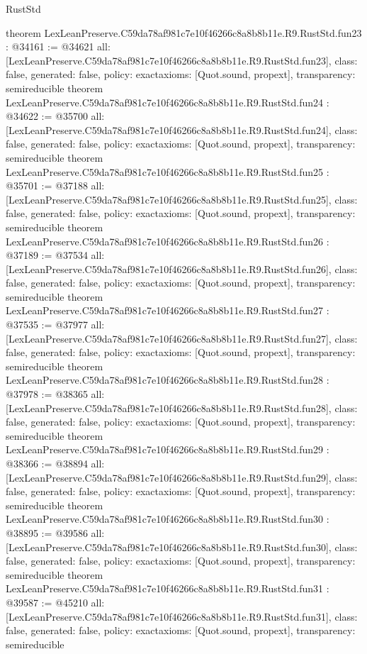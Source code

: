 \begin{lexlean}{RustStd}
\begin{coremodule}
{}
theorem LexLeanPreserve.C59da78af981c7e10f46266c8a8b8b11e.R9.RustStd.fun23 : @34161 := @34621 {
  all: [LexLeanPreserve.C59da78af981c7e10f46266c8a8b8b11e.R9.RustStd.fun23],
  class: false,
  generated: false,
  policy: exact{axioms: [Quot.sound, propext]},
  transparency: semireducible
}
theorem LexLeanPreserve.C59da78af981c7e10f46266c8a8b8b11e.R9.RustStd.fun24 : @34622 := @35700 {
  all: [LexLeanPreserve.C59da78af981c7e10f46266c8a8b8b11e.R9.RustStd.fun24],
  class: false,
  generated: false,
  policy: exact{axioms: [Quot.sound, propext]},
  transparency: semireducible
}
theorem LexLeanPreserve.C59da78af981c7e10f46266c8a8b8b11e.R9.RustStd.fun25 : @35701 := @37188 {
  all: [LexLeanPreserve.C59da78af981c7e10f46266c8a8b8b11e.R9.RustStd.fun25],
  class: false,
  generated: false,
  policy: exact{axioms: [Quot.sound, propext]},
  transparency: semireducible
}
theorem LexLeanPreserve.C59da78af981c7e10f46266c8a8b8b11e.R9.RustStd.fun26 : @37189 := @37534 {
  all: [LexLeanPreserve.C59da78af981c7e10f46266c8a8b8b11e.R9.RustStd.fun26],
  class: false,
  generated: false,
  policy: exact{axioms: [Quot.sound, propext]},
  transparency: semireducible
}
theorem LexLeanPreserve.C59da78af981c7e10f46266c8a8b8b11e.R9.RustStd.fun27 : @37535 := @37977 {
  all: [LexLeanPreserve.C59da78af981c7e10f46266c8a8b8b11e.R9.RustStd.fun27],
  class: false,
  generated: false,
  policy: exact{axioms: [Quot.sound, propext]},
  transparency: semireducible
}
theorem LexLeanPreserve.C59da78af981c7e10f46266c8a8b8b11e.R9.RustStd.fun28 : @37978 := @38365 {
  all: [LexLeanPreserve.C59da78af981c7e10f46266c8a8b8b11e.R9.RustStd.fun28],
  class: false,
  generated: false,
  policy: exact{axioms: [Quot.sound, propext]},
  transparency: semireducible
}
theorem LexLeanPreserve.C59da78af981c7e10f46266c8a8b8b11e.R9.RustStd.fun29 : @38366 := @38894 {
  all: [LexLeanPreserve.C59da78af981c7e10f46266c8a8b8b11e.R9.RustStd.fun29],
  class: false,
  generated: false,
  policy: exact{axioms: [Quot.sound, propext]},
  transparency: semireducible
}
theorem LexLeanPreserve.C59da78af981c7e10f46266c8a8b8b11e.R9.RustStd.fun30 : @38895 := @39586 {
  all: [LexLeanPreserve.C59da78af981c7e10f46266c8a8b8b11e.R9.RustStd.fun30],
  class: false,
  generated: false,
  policy: exact{axioms: [Quot.sound, propext]},
  transparency: semireducible
}
theorem LexLeanPreserve.C59da78af981c7e10f46266c8a8b8b11e.R9.RustStd.fun31 : @39587 := @45210 {
  all: [LexLeanPreserve.C59da78af981c7e10f46266c8a8b8b11e.R9.RustStd.fun31],
  class: false,
  generated: false,
  policy: exact{axioms: [Quot.sound, propext]},
  transparency: semireducible
}
\end{coremodule}
\end{lexlean}

